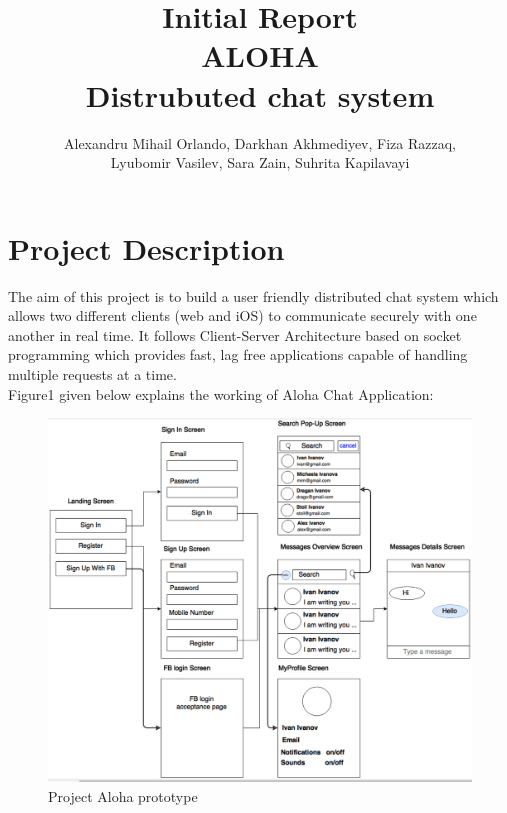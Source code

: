 \documentclass[12pt]{article}
\title{Initial Report\\ ALOHA \\Distrubuted chat system}
\author{Alexandru Mihail Orlando, Darkhan Akhmediyev, Fiza Razzaq, \\ Lyubomir Vasilev, Sara Zain, Suhrita Kapilavayi}
\begin{document}
 

\maketitle

\section{Project Description}

The aim of this project is to build a user friendly distributed chat system which allows two different clients (web and iOS) to communicate securely with one another in real time. It follows Client-Server Architecture based on socket programming which provides fast, lag free applications capable of handling multiple requests at a time.\\
Figure1 given below explains the working of Aloha Chat Application:

\begin{figure}[ht!]
\centering
\includegraphics[width=1\textwidth, hsize=0.8\hsize]{Design.png}
\caption{Project Aloha prototype}
\label{fig:figgantt}
\end{figure}
\end{document}
